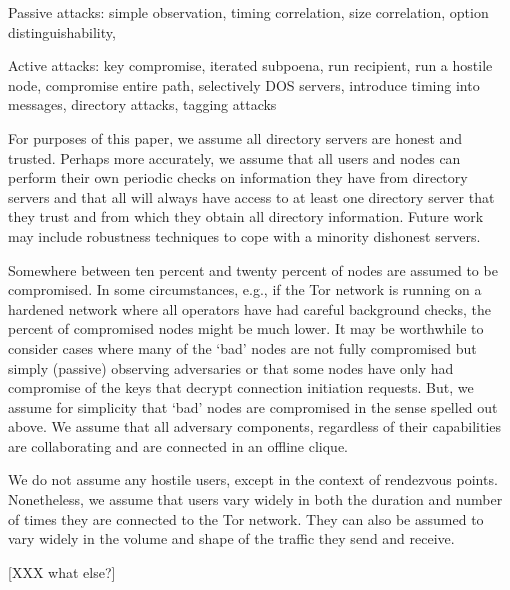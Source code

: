 \documentclass[times,10pt,twocolumn]{article}
\begin{document}
Passive attacks:
simple observation,
timing correlation,
size correlation,
option distinguishability,

Active attacks:
key compromise,
iterated subpoena,
run recipient,
run a hostile node,
compromise entire path,
selectively DOS servers,
introduce timing into messages,
directory attacks,
tagging attacks



For purposes of this paper, we assume all directory servers are honest
and trusted. Perhaps more accurately, we assume that all users and
nodes can perform their own periodic checks on information they have
from directory servers and that all will always have access to at
least one directory server that they trust and from which they obtain
all directory information. Future work may include robustness
techniques to cope with a minority dishonest servers.

Somewhere between ten percent and twenty percent of nodes are assumed
to be compromised. In some circumstances, e.g., if the Tor network is
running on a hardened network where all operators have had careful
background checks, the percent of compromised nodes might be much
lower. It may be worthwhile to consider cases where many of the `bad'
nodes are not fully compromised but simply (passive) observing
adversaries or that some nodes have only had compromise of the keys
that decrypt connection initiation requests. But, we assume for
simplicity that `bad' nodes are compromised in the sense spelled out
above. We assume that all adversary components, regardless of their
capabilities are collaborating and are connected in an offline clique.

We do not assume any hostile users, except in the context of
rendezvous points. Nonetheless, we assume that users vary widely in
both the duration and number of times they are connected to the Tor
network. They can also be assumed to vary widely in the volume and
shape of the traffic they send and receive.


[XXX what else?]



\label{sec:design}



\label{subsec:exitpolicies}

\label{subsec:dir-servers}
\end{document}
